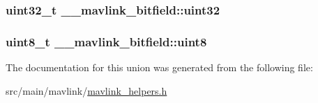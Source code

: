 \hypertarget{union____mavlink__bitfield_ab43ed56310c2d778ebaa7a5a21cb6587}{
\subsubsection[{uint32}]{\setlength{\rightskip}{0pt plus 5cm}uint32\+\_\+t \+\_\+\+\_\+mavlink\+\_\+bitfield\+::uint32}}\label{union____mavlink__bitfield_ab43ed56310c2d778ebaa7a5a21cb6587}
\hypertarget{union____mavlink__bitfield_ade669a5f63c53f0d61f636eff94417c0}{
\subsubsection[{uint8}]{\setlength{\rightskip}{0pt plus 5cm}uint8\+\_\+t \+\_\+\+\_\+mavlink\+\_\+bitfield\+::uint8}}\label{union____mavlink__bitfield_ade669a5f63c53f0d61f636eff94417c0}


The documentation for this union was generated from the following file\+:\begin{DoxyCompactItemize}
\item 
src/main/mavlink/\hyperlink{mavlink__helpers_8h}{mavlink\+\_\+helpers.\+h}\end{DoxyCompactItemize}
